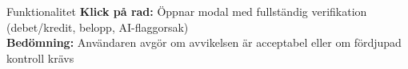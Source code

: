 \documentclass[10pt]{beamer}
\begin{document}
\begin{frame}[label=bokanalys]
  \vspace{0.3cm}
  \begin{block}{Funktionalitet}
    \footnotesize
    \textbf{Klick på rad:} Öppnar modal med fullständig verifikation (debet/kredit, belopp, AI-flaggorsak)\\
    \textbf{Bedömning:} Användaren avgör om avvikelsen är acceptabel eller om fördjupad kontroll krävs
  \end{block}
  
  \vspace{0.5cm}
  \begin{flushright}
    \hyperlink{fortnoxkoppling}{}
  \end{flushright}
\end{frame}



\end{document}
